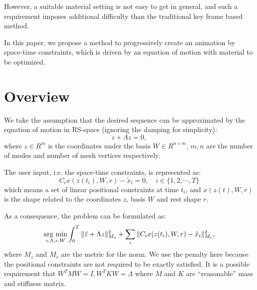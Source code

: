 \documentclass[9pt,twocolumn]{extarticle}
\newcommand{\argmin}{\operatornamewithlimits{arg\ min}}
\begin{document}
However, a suitable material setting is not easy to get in general,
and such a requirement imposes additional difficulty than the
traditional key frame based method.

In this paper, we propose a method to progressively create an
animation by space-time constraints, which is driven by an equation of
motion with material to be optimized.


\section{Overview}
We take the assumption that the desired sequence can be approximated
by the equation of motion in RS-space (ignoring the damping for
simplicity):
\begin{equation}
  \ddot{z} + \Lambda z=0,
\end{equation}
where $z \in R^m$ is the coordinates under the basis $W \in R^{n\times
  m}$, $m,n$ are the number of modes and number of mesh vertices
respectively.

The user input, i.e. the space-time constraints, is represented as:
\begin{equation}\label{opt_ctrl}
  C_ix(z(t_i), W, r) - \tilde{x}_i = 0, \quad i \in \{1, 2, \cdots,
  T\}
\end{equation}
which means a set of linear positional constraints at time $t_i$, and
$x(z(t), W, r)$ is the shape related to the coordinates $z$, basis
$W$ and rest shape $r$.

As a consequence, the problem can be formulated as:
\begin{equation}
  \argmin_{z,\Lambda,r,W} \int_0^T \|\ddot{z} + \Lambda z\|_{M_z}^2 + \sum_i \|C_ix(z(t_i), W, r) - \tilde{x}_i\|_{M_c}^2,
  \label{eq:final_eq}
\end{equation}
where $M_z$ and $M_c$ are the metric for the norm.  We use the penalty
here because the positional constraints are not required to be exactly
satisfied.  It is a possible requirement that $W^TMW=I, W^TKW=\Lambda$
where $M$ and $K$ are ``reasonable'' mass and stiffness matrix.
\end{document}
